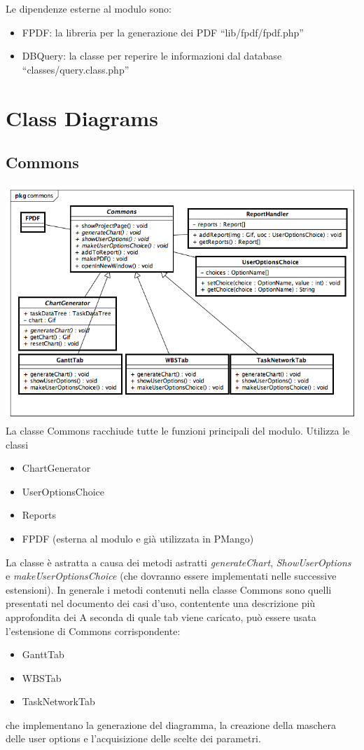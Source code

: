 \documentclass[a4paper, 12pt]{report}
\begin{document}
Le dipendenze esterne al modulo sono:
\begin{itemize}
	\item FPDF: la libreria per la generazione dei PDF 
	``lib/fpdf/fpdf.php''
	\item DBQuery: la classe per reperire le informazioni dal database 
	``classes/query.class.php''
\end{itemize}

\chapter{Class Diagrams}

\section{Commons}

\includegraphics[width=\textwidth]{chart/Commons.png}
La classe Commons racchiude tutte le funzioni principali del modulo. Utilizza le classi
\begin{itemize}
	\item ChartGenerator
	\item UserOptionsChoice
	\item Reports
	\item FPDF (esterna al modulo e gi\`a utilizzata in PMango)
\end{itemize}
La classe \`e astratta a causa dei metodi astratti \emph{generateChart}, \emph{ShowUserOptions} e \emph{makeUserOptionsChoice} (che dovranno essere implementati nelle successive estensioni). In generale i metodi contenuti nella classe Commons sono quelli presentati nel documento dei casi d'uso, contentente una descrizione pi\`u approfondita dei
A seconda di quale tab viene caricato, pu\`o essere usata l'estensione di Commons corrispondente: 
\begin{itemize}
	\item GanttTab
	\item WBSTab
	\item TaskNetworkTab
\end{itemize}
che implementano la generazione del diagramma, la creazione della maschera delle user options e l'acquisizione delle scelte dei parametri.
\end{document}
